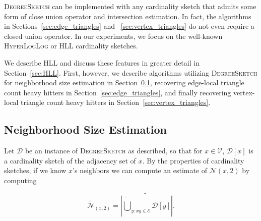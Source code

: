 \documentclass{vldb}
\newcommand{\algoname}[1]{\textnormal{\textsc{#1}}}
\begin{document}
\algoname{DegreeSketch} can be implemented with any cardinality sketch that admits some form of close union operator and intersection estimation.
In fact, the algorithms in Sections~\ref{sec:edge_triangles} and ~\ref{sec:vertex_triangles} do not even require a closed union operator.
In our experiments, we focus on the well-known \algoname{HyperLogLog} or \algoname{HLL} cardinality sketches.

We describe \algoname{HLL} and discuss these features in greater detail in Section~\ref{sec:HLL}.
First, however, we describe algorithms utilizing \algoname{DegreeSketch} for neighborhood size estimation in Section~\ref{sec:neighborhoods}, recovering edge-local triangle count heavy hitters in Section~\ref{sec:edge_triangles}, and finally recovering vertex-local triangle count heavy hitters in Section~\ref{sec:vertex_triangles}.

\subsection{Neighborhood Size Estimation}
 \label{sec:neighborhoods}

Let $\mathcal{D}$ be an instance of \algoname{DegreeSketch} as described, so that for $x \in \mathcal{V}$, $\mathcal{D}[x]$ is a cardinality sketch of the adjacency set of $x$.
By the properties of cardinality sketches, if we know $x$'s neighbors we can compute an estimate of $\mathcal{N}(x, 2)$ by computing 

%
\begin{equation} \label{eq:estimate:nbhd}
	\widetilde{\mathcal{N}}_(x, 2) 
	= \widetilde{\left | \widetilde{\bigcup}_{y: xy \in \mathcal{E}} \mathcal{D}[y] \right |}.
\end{equation}
%

\end{document}
